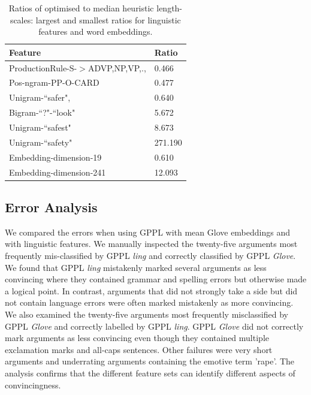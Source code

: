 \begin{table}
  \begin{tabularx}{\columnwidth}{l | X }
  Feature & Ratio\\
  \hline
  ProductionRule-S-$>$ADVP,NP,VP,., & 0.466 \nonumber\\
  Pos-ngram-PP-O-CARD & 0.477 \nonumber\\
  Unigram-``safer", & 0.640 \nonumber\\
  \hline
  Bigram-``?"-``look" & 5.672 \nonumber\\
  Unigram-``safest" & 8.673 \nonumber\\
  Unigram-``safety" & 271.190 \nonumber\\
  \hline
  Embedding-dimension-19 & 0.610 \nonumber\\
  \hline
  Embedding-dimension-241 & 12.093 \nonumber\\
  \end{tabularx}
  \caption{Ratios of optimised to median heuristic length-scales: largest and smallest
  ratios for linguistic features and word embeddings.}
  \label{tab:extreme_features}
\end{table}


\subsection{Error Analysis}

We compared the errors when using GPPL with mean Glove embeddings
and with linguistic features. We
manually inspected the twenty-five arguments most frequently
mis-classified by GPPL \emph{ling} and correctly classified by GPPL \emph{Glove}.
We found that GPPL \emph{ling} mistakenly marked several arguments 
as less convincing where they contained grammar and spelling errors but otherwise
made a logical point. 
In contrast, arguments that did not strongly take a side but did not contain 
language errors were often marked mistakenly as more convincing.
We also examined the twenty-five arguments most frequently misclassified by GPPL \emph{Glove} and correctly labelled by GPPL \emph{ling}.
GPPL \emph{Glove} did not correctly mark arguments as less convincing 
even though they contained multiple exclamation marks and all-caps sentences. 
Other failures were very short arguments and underrating arguments containing the emotive term 'rape'.
The analysis confirms that the different feature sets can identify different aspects of convincingness.

